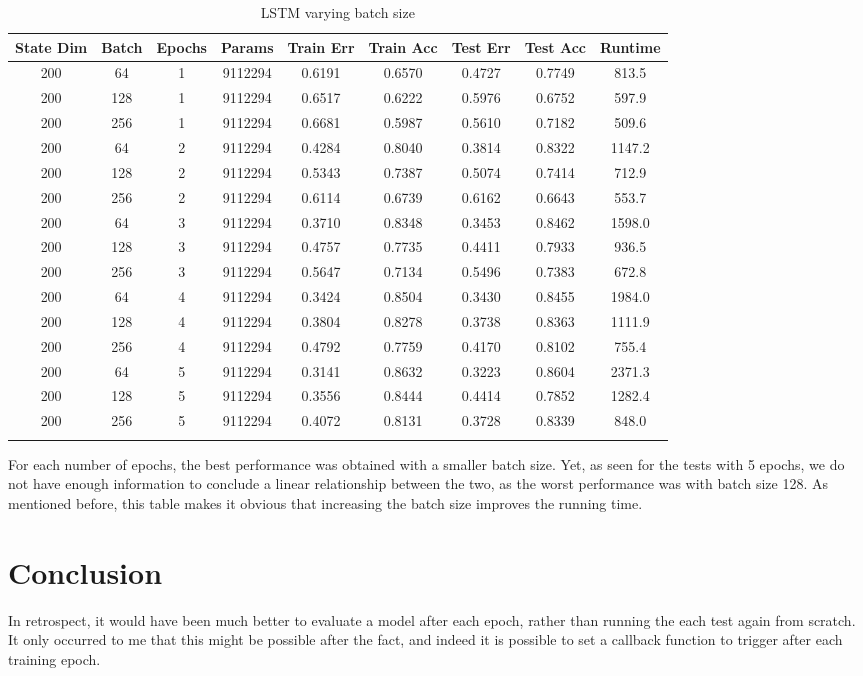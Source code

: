 \documentclass[letterpaper, 10pt]{article}
\begin{document}
\begin{longtable}{c | c | c | c | c | c | c | c | c}
State Dim & Batch & Epochs & Params & Train Err & Train Acc & Test Err & Test Acc & Runtime\\
\hline
\endhead
200 & 64 & 1 & 9112294 & 0.6191 & 0.6570 & 0.4727 & 0.7749 & 813.5 \\
200 & 128 & 1 & 9112294 & 0.6517 & 0.6222 & 0.5976 & 0.6752 & 597.9 \\
200 & 256 & 1 & 9112294 & 0.6681 & 0.5987 & 0.5610 & 0.7182 & 509.6 \\
\hline
200 & 64 & 2 & 9112294 & 0.4284 & 0.8040 & 0.3814 & 0.8322 & 1147.2 \\
200 & 128 & 2 & 9112294 & 0.5343 & 0.7387 & 0.5074 & 0.7414 & 712.9 \\
200 & 256 & 2 & 9112294 & 0.6114 & 0.6739 & 0.6162 & 0.6643 & 553.7 \\
\hline
200 & 64 & 3 & 9112294 & 0.3710 & 0.8348 & 0.3453 & 0.8462 & 1598.0 \\
200 & 128 & 3 & 9112294 & 0.4757 & 0.7735 & 0.4411 & 0.7933 & 936.5 \\
200 & 256 & 3 & 9112294 & 0.5647 & 0.7134 & 0.5496 & 0.7383 & 672.8 \\
\hline
200 & 64 & 4 & 9112294 & 0.3424 & 0.8504 & 0.3430 & 0.8455 & 1984.0 \\
200 & 128 & 4 & 9112294 & 0.3804 & 0.8278 & 0.3738 & 0.8363 & 1111.9 \\
200 & 256 & 4 & 9112294 & 0.4792 & 0.7759 & 0.4170 & 0.8102 & 755.4 \\
\hline
200 & 64 & 5 & 9112294 & 0.3141 & 0.8632 & 0.3223 & 0.8604 & 2371.3 \\
200 & 128 & 5 & 9112294 & 0.3556 & 0.8444 & 0.4414 & 0.7852 & 1282.4 \\
200 & 256 & 5 & 9112294 & 0.4072 & 0.8131 & 0.3728 & 0.8339 & 848.0 \\
\caption{LSTM varying batch size}
\label{tab:batchsizelstm}
\end{longtable}

For each number of epochs, the best performance was obtained with a smaller batch
 size. Yet, as seen for the tests with 5 epochs, we do not have enough information
 to conclude a linear relationship between the two, as the worst performance was
 with batch size 128. As mentioned before, this table makes it obvious that
 increasing the batch size improves the running time.






\section{Conclusion}

In retrospect, it would have been much better to evaluate a model after each epoch,
rather than running the each test again from scratch. It only occurred to me that this
might be possible after the fact, and indeed it is possible to set a callback
function to trigger after each training epoch.


\newpage


\end{document}
